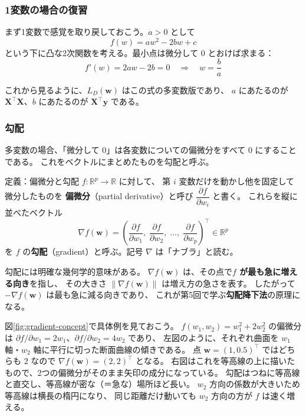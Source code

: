 \subsubsection{1変数の場合の復習}

まず1変数で感覚を取り戻しておこう。$a > 0$ として
\begin{equation*}
  f(w) = a w^2 - 2bw + c
\end{equation*}
という下に凸な2次関数を考える。最小点は微分して $0$ とおけば求まる：
\begin{equation*}
  f'(w) = 2aw - 2b = 0 \quad \Longrightarrow \quad w = \frac{b}{a}
\end{equation*}

これから見るように、$L_D(\bm{w})$ はこの式の多変数版であり、
$a$ にあたるのが $\bm{X}^\top\bm{X}$、$b$ にあたるのが $\bm{X}^\top\bm{y}$ である。

\subsubsection{勾配}

多変数の場合、「微分して $0$」は各変数についての偏微分をすべて $0$ にすることである。
これをベクトルにまとめたものを勾配と呼ぶ。

\begin{itembox}[l]{定義：偏微分と勾配}
$f : \mathbb{R}^p \to \mathbb{R}$ に対して、
第 $i$ 変数だけを動かし他を固定して微分したものを
\textbf{偏微分}（partial derivative）と呼び $\dfrac{\partial f}{\partial w_i}$ と書く。
これらを縦に並べたベクトル
\begin{equation}
  \nabla f(\bm{w}) =
  \left( \frac{\partial f}{\partial w_1},\;
         \frac{\partial f}{\partial w_2},\; \ldots,\;
         \frac{\partial f}{\partial w_p} \right)^\top \in \mathbb{R}^p
\end{equation}
を $f$ の\textbf{勾配}（gradient）と呼ぶ。記号 $\nabla$ は「ナブラ」と読む。
\end{itembox}

勾配には明確な幾何学的意味がある。
$\nabla f(\bm{w})$ は、その点で\textbf{$f$ が最も急に増える向き}を指し、
その大きさ $\|\nabla f(\bm{w})\|$ は増え方の急さを表す。
したがって $-\nabla f(\bm{w})$ は最も急に減る向きであり、
これが第5回で学ぶ\textbf{勾配降下法}の原理になる。

図\ref{fig:gradient-concept}で具体例を見ておこう。
$f(w_1, w_2) = w_1^2 + 2w_2^2$ の偏微分は
$\partial f/\partial w_1 = 2w_1$、$\partial f/\partial w_2 = 4w_2$ であり、
左図のように、それぞれ曲面を $w_1$ 軸・$w_2$ 軸に平行に切った断面曲線の傾きである。
点 $\bm{w} = (1, 0.5)^\top$ ではどちらも $2$ なので $\nabla f(\bm{w}) = (2, 2)^\top$ となる。
右図はこれを等高線の上に描いたもので、2つの偏微分がそのまま矢印の成分になっている。
勾配はつねに等高線と直交し、等高線が密な（＝急な）場所ほど長い。
$w_2$ 方向の係数が大きいため等高線は横長の楕円になり、
同じ距離だけ動いても $w_2$ 方向の方が $f$ は速く増える。

